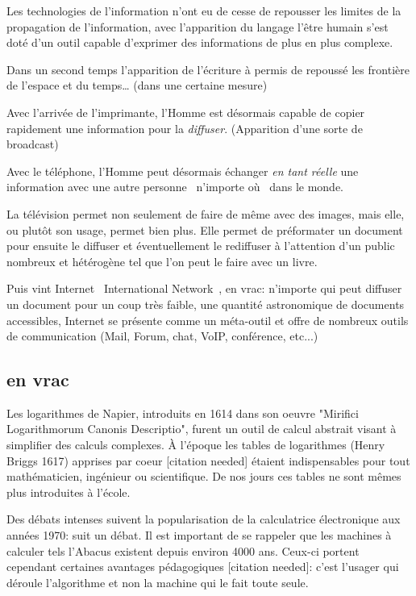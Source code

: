 Les technologies de l'information n'ont eu de cesse de repousser les limites de
la propagation de l'information, avec l'apparition du langage l'être humain
s'est doté d'un outil capable d'exprimer des informations de plus en plus
complexe. 

Dans un second temps l'apparition de l'écriture à permis de repoussé les
frontière de l'espace et du temps… (dans une certaine mesure)

Avec l'arrivée de l'imprimante, l'Homme est désormais capable de copier
rapidement une information pour la \emph{diffuser}. (Apparition d'une sorte
de broadcast)

Avec le téléphone, l'Homme peut désormais échanger \emph{en tant réelle} une 
information avec une autre personne \og{}~n'importe où~\fg{} dans le monde.

La télévision permet non seulement de faire de même avec des images, mais elle,
ou plutôt son usage, permet bien plus. Elle permet de préformater un document pour ensuite le
diffuser et éventuellement le rediffuser à l'attention d'un public nombreux et
hétérogène tel que l'on peut le faire avec un livre.

Puis vint Internet \og{}~International Network~\fg{}, en vrac: n'importe qui
peut diffuser un document pour un coup très faible, une quantité astronomique
de documents accessibles, Internet se présente comme un méta-outil et offre de
nombreux outils de communication (Mail, Forum, chat, VoIP, conférence, etc...)

\subsection{en vrac}

Les logarithmes de Napier, introduits en 1614 dans son oeuvre
"Mirifici Logarithmorum Canonis Descriptio", furent un outil de calcul
abstrait visant à simplifier des calculs complexes. À l'époque les
tables de logarithmes (Henry Briggs 1617) apprises par coeur [citation
  needed] étaient indispensables pour tout mathématicien, ingénieur ou
scientifique. De nos jours ces tables ne sont mêmes plus introduites à
l'école.

Des débats intenses suivent la popularisation de la calculatrice électronique 
aux années 1970: suit un débat. Il est important de se rappeler que les 
machines à calculer tels l'Abacus existent depuis environ 4000 ans. Ceux-ci 
portent cependant certaines avantages pédagogiques [citation needed]: c'est 
l'usager qui déroule l'algorithme et non la machine qui le fait toute seule. 

